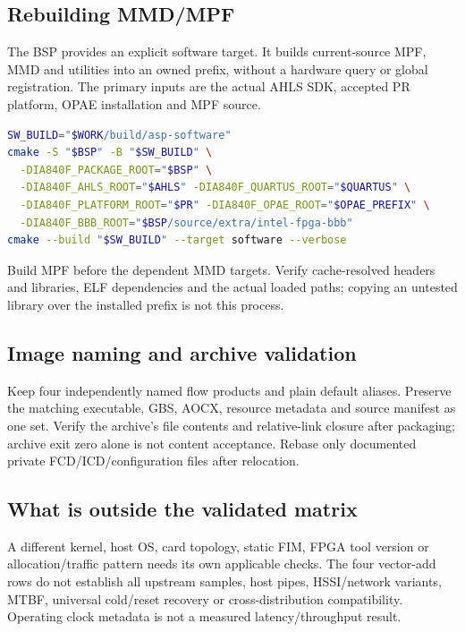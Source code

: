 \documentclass[11pt,letterpaper]{article}
\newcommand{\src}[1]{\cite{S#1}}
\begin{document}
\subsection{Rebuilding MMD/MPF}
The BSP provides an explicit software target. It builds current-source MPF,
MMD and utilities into an owned prefix, without a hardware query or global
registration. The primary inputs are the actual AHLS SDK, accepted PR platform,
OPAE installation and MPF source.\src{11}
\begin{lstlisting}[language=bash]
SW_BUILD="$WORK/build/asp-software"
cmake -S "$BSP" -B "$SW_BUILD" \
  -DIA840F_PACKAGE_ROOT="$BSP" \
  -DIA840F_AHLS_ROOT="$AHLS" -DIA840F_QUARTUS_ROOT="$QUARTUS" \
  -DIA840F_PLATFORM_ROOT="$PR" -DIA840F_OPAE_ROOT="$OPAE_PREFIX" \
  -DIA840F_BBB_ROOT="$BSP/source/extra/intel-fpga-bbb"
cmake --build "$SW_BUILD" --target software --verbose
\end{lstlisting}
Build MPF before the dependent MMD targets. Verify cache-resolved headers and
libraries, ELF dependencies and the actual loaded paths; copying an untested
library over the installed prefix is not this process.

\subsection{Image naming and archive validation}
Keep four independently named flow products and plain default aliases. Preserve
the matching executable, GBS, AOCX, resource metadata and source manifest as one
set. Verify the archive's file contents and relative-link closure after packaging;
archive exit zero alone is not content acceptance. Rebase only documented
private FCD/ICD/configuration files after relocation.

\subsection{What is outside the validated matrix}
A different kernel, host OS, card topology, static FIM, FPGA tool version or
allocation/traffic pattern needs its own applicable checks. The four vector-add
rows do not establish all upstream samples, host pipes, HSSI/network variants,
MTBF, universal cold/reset recovery or cross-distribution compatibility.
Operating clock metadata is not a measured latency/throughput result.
\end{document}
